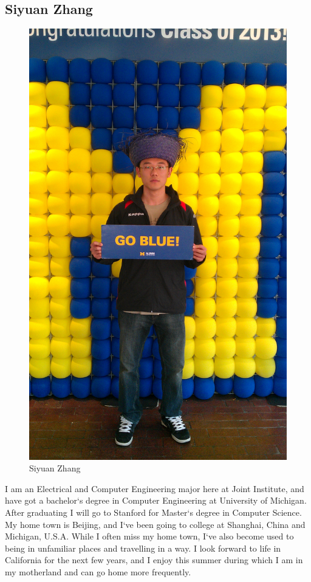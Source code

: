 \documentclass[paper=letter, fontsize=11pt]{scrartcl}
\numberwithin{equation}{section}		%
\numberwithin{figure}{section}			%
\numberwithin{table}{section}			%
\begin{document}
\subsection{Siyuan Zhang}
\begin{figure}[H]
	\centering
	\includegraphics[scale=0.08]{zsy}
	\caption{Siyuan Zhang}
\end{figure}
I am an Electrical and Computer Engineering major here at Joint Institute, and have got a bachelor`s degree in Computer Engineering at University of Michigan. After graduating I will go to Stanford for Master`s degree in Computer Science. My home town is Beijing, and I`ve been going to college at Shanghai, China and Michigan, U.S.A. While I often miss my home town, I`ve also become used to being in unfamiliar places and travelling in a way. I look forward to life in California for the next few years, and I enjoy this summer during which I am in my motherland and can go home more frequently.
\end{document}
